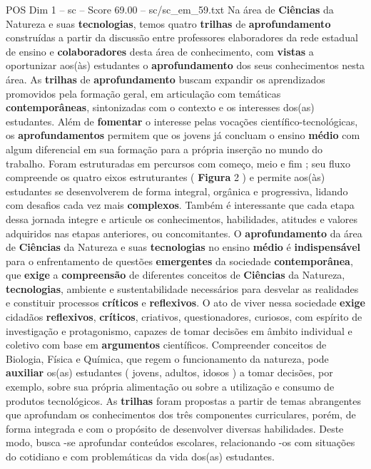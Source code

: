 \begin{textsample}{POS Dim 1 – sc – Score 69.00 – sc/sc\_em\_59.txt}
Na área de \textbf{Ciências} da Natureza e suas \textbf{tecnologias}, temos quatro \textbf{trilhas} de \textbf{aprofundamento} construídas a partir da discussão entre professores elaboradores da rede estadual de ensino e \textbf{colaboradores} desta área de conhecimento, com \textbf{vistas} a oportunizar aos(às) estudantes o \textbf{aprofundamento} dos seus conhecimentos nesta área.
As \textbf{trilhas} de \textbf{aprofundamento} buscam expandir os aprendizados promovidos pela formação geral, em articulação com temáticas \textbf{contemporâneas}, sintonizadas com o contexto e os interesses dos(as) estudantes.
Além de \textbf{fomentar} o interesse pelas vocações científico-tecnológicas, os \textbf{aprofundamentos} permitem que os jovens já concluam o ensino \textbf{médio} com algum diferencial em sua formação para a própria inserção no mundo do trabalho.
Foram estruturadas em percursos com começo, meio e fim ; seu fluxo compreende os quatro eixos estruturantes ( \textbf{Figura} 2 ) e permite aos(às) estudantes se desenvolverem de forma integral, orgânica e progressiva, lidando com desafios cada vez mais \textbf{complexos}.
Também é interessante que cada etapa dessa jornada integre e articule os conhecimentos, habilidades, atitudes e valores adquiridos nas etapas anteriores, ou concomitantes.
O \textbf{aprofundamento} da área de \textbf{Ciências} da Natureza e suas \textbf{tecnologias} no ensino \textbf{médio} é \textbf{indispensável} para o enfrentamento de questões \textbf{emergentes} da sociedade \textbf{contemporânea}, que \textbf{exige} a \textbf{compreensão} de diferentes conceitos de \textbf{Ciências} da Natureza, \textbf{tecnologias}, ambiente e sustentabilidade necessários para desvelar as realidades e constituir processos \textbf{críticos} e \textbf{reflexivos}.
O ato de viver nessa sociedade \textbf{exige} cidadãos \textbf{reflexivos}, \textbf{críticos}, criativos, questionadores, curiosos, com espírito de investigação e protagonismo, capazes de tomar decisões em âmbito individual e coletivo com base em \textbf{argumentos} científicos.
Compreender conceitos de Biologia, Física e Química, que regem o funcionamento da natureza, pode \textbf{auxiliar} os(as) estudantes ( jovens, adultos, idosos ) a tomar decisões, por exemplo, sobre sua própria alimentação ou sobre a utilização e consumo de produtos tecnológicos.
As \textbf{trilhas} foram propostas a partir de temas abrangentes que aprofundam os conhecimentos dos três componentes curriculares, porém, de forma integrada e com o propósito de desenvolver diversas habilidades.
Deste modo, busca -se aprofundar conteúdos escolares, relacionando -os com situações do cotidiano e com problemáticas da vida dos(as) estudantes.

\end{textsample}
